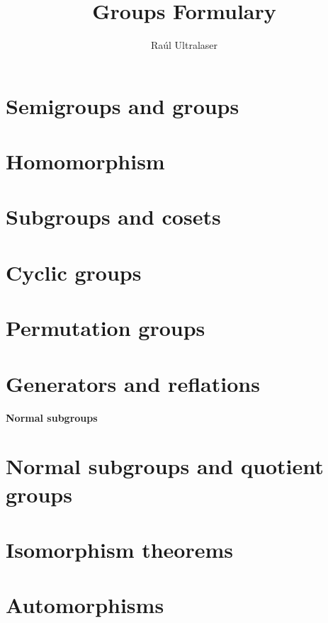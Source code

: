 \documentclass[twocolumn]{article}
\title{Groups Formulary}
\author{Raúl Ultralaser}
\date{}
\begin{document}
\maketitle
\section{Semigroups and groups}


\section{Homomorphism}


\section{Subgroups and cosets}


\section{Cyclic groups}


\section{Permutation groups}


\section{Generators and reflations}



\textbf{\Huge Normal subgroups}
\section{Normal subgroups and quotient groups}

\section{Isomorphism theorems}

\section{Automorphisms}
\end{document}
